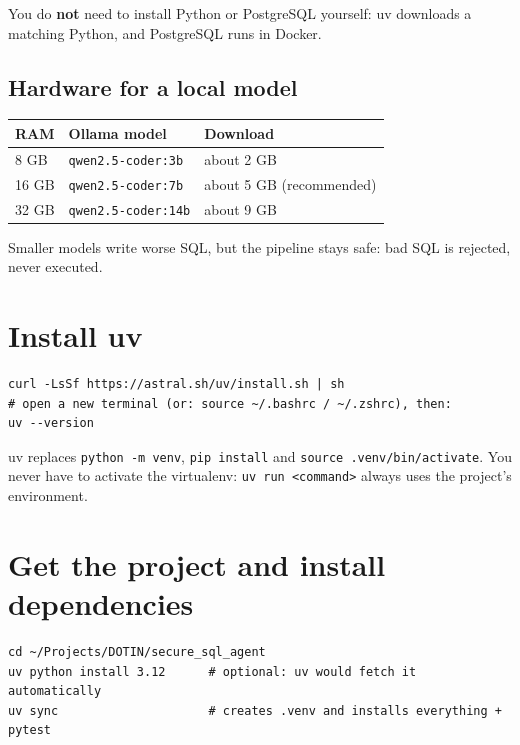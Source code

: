 \documentclass[11pt,a4paper]{article}
\newcommand{\note}[1]{%
  \par\smallskip\noindent\colorbox{warnbg}{\parbox{\dimexpr\linewidth-2\fboxsep}{\small #1}}\par\smallskip}
\begin{document}
You do \textbf{not} need to install Python or PostgreSQL yourself: uv
downloads a matching Python, and PostgreSQL runs in Docker.

\subsection{Hardware for a local model}

\begin{center}
\begin{tabular}{@{}lll@{}}
\toprule
\textbf{RAM} & \textbf{Ollama model} & \textbf{Download} \\
\midrule
8 GB   & \texttt{qwen2.5-coder:3b}  & about 2 GB \\
16 GB  & \texttt{qwen2.5-coder:7b}  & about 5 GB (recommended) \\
32 GB  & \texttt{qwen2.5-coder:14b} & about 9 GB \\
\bottomrule
\end{tabular}
\end{center}

Smaller models write worse SQL, but the pipeline stays safe: bad SQL is
rejected, never executed.

\section{Install uv}

\begin{lstlisting}
curl -LsSf https://astral.sh/uv/install.sh | sh
# open a new terminal (or: source ~/.bashrc / ~/.zshrc), then:
uv --version
\end{lstlisting}

\note{uv replaces \texttt{python -m venv}, \texttt{pip install} and
\texttt{source .venv/bin/activate}. You never have to activate the
virtualenv: \texttt{uv run <command>} always uses the project's
environment.}

\section{Get the project and install dependencies}

\begin{lstlisting}
cd ~/Projects/DOTIN/secure_sql_agent
uv python install 3.12      # optional: uv would fetch it automatically
uv sync                     # creates .venv and installs everything + pytest
\end{lstlisting}
\end{document}
